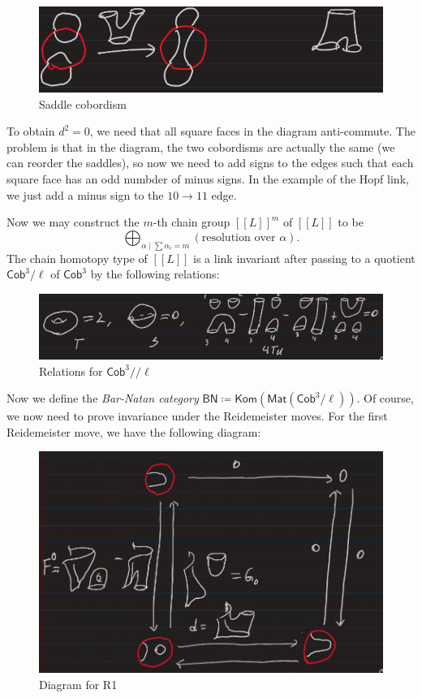 \documentclass[leqno, openany]{memoir}
\theoremstyle{definition}
\theoremstyle{remark}
\theoremstyle{plain}
\theoremstyle{definition}
\theoremstyle{remark}
\newcommand{\ms}[1]{\mathsf{#1}}
\begin{document}
\begin{figure}[H]
    \centering
    \includegraphics[width=0.8\linewidth]{seb3.png}
    \caption{Saddle cobordism}%
    \label{fig:seb2}
\end{figure}

To obtain $d^2 = 0$, we need that all square faces in the diagram anti-commute. The problem is that in the diagram, the two cobordisms are actually the same (we can reorder the saddles), so now we need to add signs to the edges such that each square face has an odd numbder of minus signs. In the example of the Hopf link, we just add a minus sign to the $10 \to 11$ edge.

Now we may construct the $m$-th chain group ${ [[L]] }^m$ of $[[L]]$ to be
\[ \bigoplus_{\alpha \mid \sum \alpha_i = m} (\text{resolution over $\alpha$}). \]
The chain homotopy type of $[[L]]$ is a link invariant after passing to a quotient $\ms{Cob}^3/\ell$ of $\ms{Cob}^3$ by the following relations:

\begin{figure}[H]
    \centering
    \includegraphics[width=0.8\linewidth]{seb5.png}
    \caption{Relations for $\ms{Cob}^3//\ell$}%
    \label{fig:seb3}
\end{figure}

Now we define the \textit{Bar-Natan category} $\ms{BN} \coloneqq \ms{Kom}(\ms{Mat}(\ms{Cob}^3/\ell))$. Of course, we now need to prove invariance under the Reidemeister moves. For the first Reidemeister move, we have the following diagram:

\begin{figure}[H]
    \centering
    \includegraphics[width=0.6\linewidth]{seb6.png}
    \caption{Diagram for R1}%
    \label{fig:seb4}
\end{figure}
\end{document}
